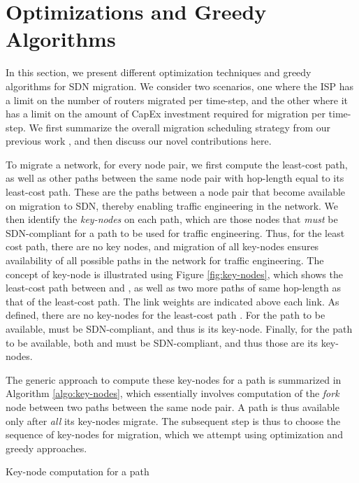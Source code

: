 \documentclass[conference]{IEEEtran}
\begin{document}
\section{Optimizations and Greedy Algorithms}\label{sec:migration-model}
In this section, we present different optimization techniques and greedy
algorithms for SDN migration. We consider two scenarios, one where
the ISP has a limit on the number of routers migrated per
time-step, and the other where it has a limit on the amount of CapEx investment
required for migration per time-step. We first summarize the overall migration
scheduling strategy from our previous work \cite{caria-sdn-migration}, and then
discuss our novel contributions here. 

\par To migrate a network, for every node pair, we first compute the least-cost
path, as well as other paths between the same node pair with hop-length equal to
its least-cost path. These are the paths between a node pair that become
available on migration to SDN, thereby enabling traffic engineering in the
network. We then identify the \emph{key-nodes} on each path, which are those
nodes that \emph{must} be SDN-compliant for a path to be used for traffic
engineering. Thus, for the least cost path, there are no key nodes, and
migration of all key-nodes ensures availability of all possible paths in the
network for traffic engineering. The concept of key-node is illustrated using
Figure \ref{fig:key-nodes}, which shows the least-cost path between  and ,
as well as two more paths of same hop-length as that of the least-cost path. The
link weights are indicated above each link. As defined, there are no key-nodes
for the least-cost path .
For the path  to be available,  must be SDN-compliant, and thus 
is its key-node. Finally, for the path  to be
available, both  and  must be SDN-compliant, and thus those are its
key-nodes.

\par The generic approach to compute these key-nodes for a path is summarized in
Algorithm \ref{algo:key-nodes}, which essentially involves computation of the
\emph{fork} node between two paths between the same node pair. A path is thus
available only after \emph{all} its key-nodes migrate. The subsequent step is thus to choose the
sequence of key-nodes for migration, which we attempt using optimization and
greedy approaches. 

\begin{algorithm}[b]
\caption{Key-node computation for a path} \label{algo:key-nodes}
\begin{algorithmic}
\STATE {}
\FORALL {}
\ENDFOR
\RETURN {}
\end{algorithmic}
\end{algorithm}
\end{document}
